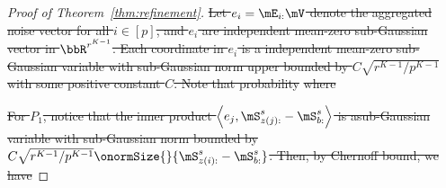 \documentclass[lettersize,onecolumn,journal]{IEEEtran}
\theoremstyle{definition}
\theoremstyle{definition}
\newcommand{\of}[1]{\left(#1\right)}
\newcommand{\ang}[1]{\left\langle#1\right\rangle}
\def\fixme#1#2{\textbf{\color{red}[FIXME (#1): #2]}}
\providecommand{\DIFdeltex}[1]{{\protect\color{red}\sout{#1}}}                      %
\providecommand{\DIFdel}[1]{\texorpdfstring{\DIFdeltex{#1}}{}} %
\begin{document}
\begin{proof}[Proof of Theorem~\ref{thm:refinement}]
\DIFdel{Let $e_i = \mE_{i:} \mV$ denote the aggregated noise vector for all $i \in [p]$, and $e_i$ are independent mean-zero sub-Gaussian vector in $\bbR^{r^{K-1}}$. Each coordinate in $e_i$ is a independent mean-zero sub-Gaussian variable with sub-Gaussian norm upper bounded by $C\sqrt{r^{K-1}/p^{K-1}}$ with some positive constant $C$.
    Note that probability 
    }%
\DIFdel{where 
    }%

\DIFdel{For $P_1$, notice that the inner product $\ang{e_j,\mS_{z(j):}^s - \mS_{b:}^s} $ is asub-Gaussian variable with sub-Gaussian norm bounded by $C \sqrt{ r^{K-1}/ p^{K-1} } \onormSize{}{ \mS_{z(i):}^s -  \mS_{b:}^s }$. Then, by Chernoff bound, we have  
    }%


\end{proof}
\end{document}
